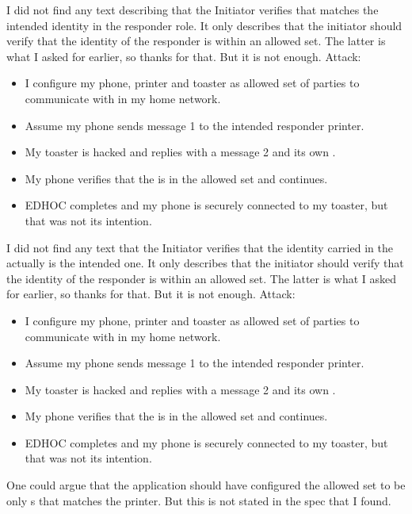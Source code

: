 \documentclass[a4paper,11pt]{article}
\theoremstyle{plain}
\theoremstyle{plain}
\begin{document}
I did not find any text describing that the Initiator verifies that
 matches the intended identity in the responder role.
%
It only describes that the initiator should verify that the identity of the
responder is within an allowed set.
%
The latter is what I asked for earlier, so thanks for that.
%
But it is not enough.
%
Attack:
%
\begin{itemize}
    \item I configure my phone, printer and toaster as allowed set of parties
        to communicate with in my home network.
    \item Assume my phone sends message 1 to the intended responder printer.
    \item My toaster is hacked and replies with a message 2 and its
        own .
    \item My phone verifies that the  is in the allowed set and
        continues.
    \item EDHOC completes and my phone is securely connected to my toaster,
        but that was not its intention.
\end{itemize}
%
I did not find any text that the Initiator verifies that the identity carried
in the  actually is the intended one.
%
It only describes that the initiator should verify that the identity of the
responder is within an allowed set.
%
The latter is what I asked for earlier, so thanks for that.
%
But it is not enough.
%
Attack:
%
\begin{itemize}
    \item I configure my phone, printer and toaster as allowed set of parties
        to communicate with in my home network.
    \item Assume my phone sends message 1 to the intended responder printer.
    \item My toaster is hacked and replies with a message 2 and its
        own .
    \item My phone verifies that the  is in the allowed set and
        continues.
    \item EDHOC completes and my phone is securely connected to my toaster,
        but that was not its intention.
\end{itemize}
%
One could argue that the application should have configured the allowed set to
be only s that matches the printer.
%
But this is not stated in the spec that I found.
%
\end{document}
